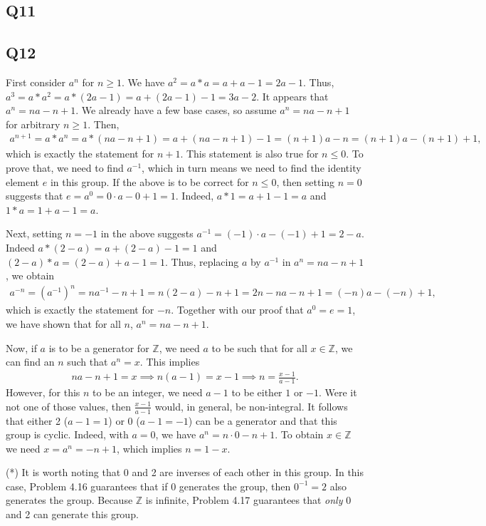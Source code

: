\documentclass[12pt]{article}
\def\Z{{\mathbb Z}}        %
\numberwithin{theorem}{section}
\numberwithin{equation}{section}
\numberwithin{remark}{section}
\numberwithin{definition}{section}
\numberwithin{theorem}{section}
\numberwithin{lemma}{section}
\numberwithin{example}{section}
\begin{document}
\subsection{Q11}

\subsection{Q12}

First consider $a^n$ for $n\ge1$. We have $a^2=a*a=a+a-1=2a-1$. Thus, $a^3=a*a^2=a*(2a-1)=a+(2a-1)-1=3a-2$. It appears that $a^n=na-n+1$. We already have a few base cases, so assume $a^n=na-n+1$ for arbitrary $n\ge1$. Then, 
\begin{align*}
	a^{n+1}=a*a^n=a*(na-n+1)=a+(na-n+1)-1=(n+1)a-n=(n+1)a-(n+1)+1,
\end{align*}
which is exactly the statement for $n+1$. This statement is also true for $n\le0$. To prove that, we need to find $a^{-1}$, which in turn means we need to find the identity element $e$ in this group. If the above is to be correct for $n\le0$, then setting $n=0$ suggests that $e=a^0=0\cdot a-0+1=1$. Indeed, $a*1=a+1-1=a$ and $1*a=1+a-1=a$. 

Next, setting $n=-1$ in the above suggests $a^{-1}=(-1)\cdot a -(-1)+1=2-a$. Indeed $a*(2-a)=a+(2-a)-1=1$ and $(2-a)*a=(2-a)+a-1=1$. Thus, replacing $a$ by $a^{-1}$ in $a^n=na-n+1$, we obtain
\begin{align*}
	a^{-n}=(a^{-1})^n=na^{-1}-n+1=n(2-a)-n+1=2n-na-n+1=(-n)a-(-n)+1,
\end{align*}
which is exactly the statement for $-n$. Together with our proof that $a^0=e=1$, we have shown that for all $n$, $a^n=na-n+1$. 

Now, if $a$ is to be a generator for $\Z$, we need $a$ to be such that for all $x\in\Z$, we can find an $n$ such that $a^n=x$. This implies
\begin{align*}
	na-n+1=x\implies n(a-1)=x-1 \implies n = \frac{x-1}{a-1}.
\end{align*}
However, for this $n$ to be an integer, we need $a-1$ to be either $1$ or $-1$. Were it not one of those values, then $ \frac{x-1}{a-1}$ would, in general, be non-integral. It follows that either 2 ($a-1=1$) or 0 ($a-1=-1$) can be a generator and that this group is cyclic. Indeed, with $a=0$, we have $a^n=n\cdot0-n+1$. To obtain $x\in\Z$ we need $x=a^n=-n+1$, which implies $n=1-x$.

\vspace{\baselineskip}

\noindent (*) It is worth noting that 0 and 2 are inverses of each other in this group. In this case, Problem 4.16 guarantees that if 0 generates the group, then $0^{-1}=2$ also generates the group. Because $\Z$ is infinite, Problem 4.17 guarantees that \emph{only} 0 and 2 can generate this group. 
\end{document}
